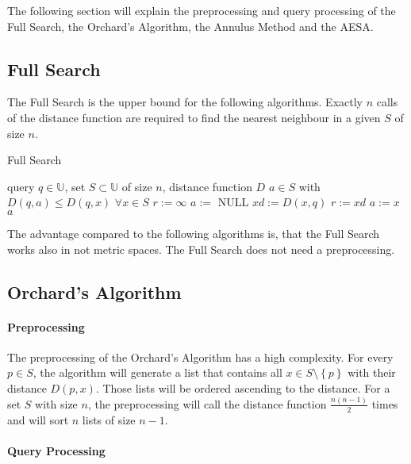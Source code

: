 \documentclass[runningheads,a4paper]{llncs}
\begin{document}
The following section will explain the preprocessing and query processing of the Full Search, the Orchard’s Algorithm,
the Annulus Method and the AESA.

\subsection{Full Search}

The Full Search is the upper bound for the following algorithms. Exactly $n$ calls of the distance function are required
to find the nearest neighbour in a given $S$ of size $n$.\\

\begin{algorithm}[H]
	\caption{Full Search}
	\label{fullsearch}
	\begin{algorithmic}
		\REQUIRE query $q \in \mathbb{U}$, set $S \subset \mathbb{U}$ of size $n$, distance function $D$
		\ENSURE $a \in S$ with $D(q, a) \le D(q, x)$ $\forall x \in S$
		\STATE $r := \infty$
		\STATE $a :=$ NULL
			\STATE $xd := D(x, q)$
				\STATE $r := xd$
				\STATE $a := x$
			\ENDIF
		\ENDFOR
		\RETURN $a$
	\end{algorithmic}
\end{algorithm}

The advantage compared to the following algorithms is, that the Full Search works also in not metric spaces. The Full
Search does not need a preprocessing.

\subsection{Orchard’s Algorithm}

\paragraph{Preprocessing}

The preprocessing of the Orchard’s Algorithm has a high complexity. For every $p \in S$, the algorithm will generate a
list that contains all $x \in S\setminus\left\{ {p}\right\}$ with their distance $D(p, x)$. Those lists will be ordered
ascending to the distance. For a set $S$ with size $n$, the preprocessing will call the distance function
$\frac{n(n-1)}{2}$ times and will sort $n$ lists of size $n-1$.

\paragraph{Query Processing}
\end{document}
